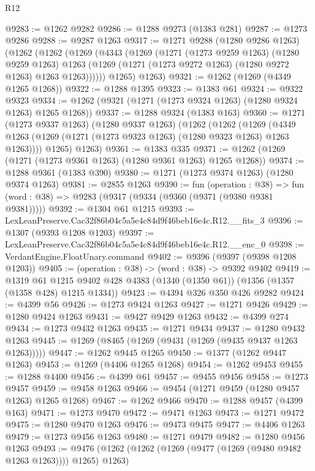 \begin{lexlean}{R12}
\begin{coremodule}
@9283 := @1262 @9282
@9286 := @1288 @9273 (@1383 @281)
@9287 := @1273 @9286
@9288 := @9287 @1263
@9317 := @1271
    @9288
    (@1280 @9286 @1263)
    (@1262
      (@1262
        (@1269
          (@4343
            (@1269
              (@1271
                (@1273 @9259 @1263)
                (@1280 @9259 @1263)
                @1263
                (@1269 (@1271 (@1273 @9272 @1263) (@1280 @9272 @1263) @1263 @1263))))))
        @1265)
      @1263)
@9321 := @1262 (@1269 (@4349 @1265 @1268))
@9322 := @1288 @1395
@9323 := @1383 @61
@9324 := @9322 @9323
@9334 := @1262 (@9321 (@1271 (@1273 @9324 @1263) (@1280 @9324 @1263) @1265 @1268))
@9337 := @1288 @9324 (@1383 @163)
@9360 := @1271
    (@1273 @9337 @1263)
    (@1280 @9337 @1263)
    (@1262
      (@1262
        (@1269 (@4349 @1263 (@1269 (@1271 (@1273 @9323 @1263) (@1280 @9323 @1263) @1263 @1263))))
        @1265)
      @1263)
@9361 := @1383 @335
@9371 := @1262 (@1269 (@1271 (@1273 @9361 @1263) (@1280 @9361 @1263) @1265 @1268))
@9374 := @1288 @9361 (@1383 @390)
@9380 := @1271 (@1273 @9374 @1263) (@1280 @9374 @1263)
@9381 := @2855 @1263
@9390 := fun (operation : @38) =>
  fun (word : @38) => @9283 (@9317 (@9334 (@9360 (@9371 (@9380 @9381 @9381)))))
@9392 := @1304 @61 @1215
@9393 := LexLeanPreserve.Cac32f86b04c5a5e4c84d9f46beb16e4c.R12.__fits_3
@9396 := @1307 (@9393 @1208 @1203)
@9397 := LexLeanPreserve.Cac32f86b04c5a5e4c84d9f46beb16e4c.R12.__enc_0
@9398 := VerdantEngine.FloatUnary.command
@9402 := @9396 (@9397 (@9398 @1208 @1203))
@9405 := (operation : @38) -> (word : @38) -> @9392 @9402
@9419 := @1319
    @61
    @1215
    @9402
    @428
    @4383
    (@1340 (@1350 @61))
    (@1356 (@1357 (@1358 @428) @1215 @1334))
@9423 := @4394 @326 @350 @426 @9282
@9424 := @4399 @56
@9426 := @1273 @9424 @1263
@9427 := @1271 @9426
@9429 := @1280 @9424 @1263
@9431 := @9427 @9429 @1263
@9432 := @4399 @274
@9434 := @1273 @9432 @1263
@9435 := @1271 @9434
@9437 := @1280 @9432 @1263
@9445 := @1269 (@8465 (@1269 (@9431 (@1269 (@9435 @9437 @1263 @1263)))))
@9447 := @1262 @9445 @1265
@9450 := @1377 (@1262 @9447 @1263)
@9453 := @1269 (@4406 @1265 @1268)
@9454 := @1262 @9453
@9455 := @1288 @4400
@9456 := @4399 @61
@9457 := @9455 @9456
@9458 := @1273 @9457
@9459 := @9458 @1263
@9466 := @9454 (@1271 @9459 (@1280 @9457 @1263) @1265 @1268)
@9467 := @1262 @9466
@9470 := @1288 @9457 (@4399 @163)
@9471 := @1273 @9470
@9472 := @9471 @1263
@9473 := @1271 @9472
@9475 := @1280 @9470 @1263
@9476 := @9473 @9475
@9477 := @4406 @1263
@9479 := @1273 @9456 @1263
@9480 := @1271 @9479
@9482 := @1280 @9456 @1263
@9493 := @9476 (@1262 (@1262 (@1269 (@9477 (@1269 (@9480 @9482 @1263 @1263)))) @1265) @1263)

\end{coremodule}
\end{lexlean}
